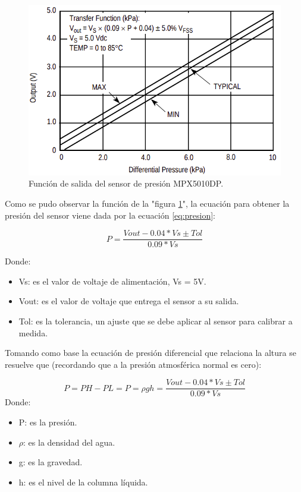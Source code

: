 \begin{figure}[h]
\centering
\includegraphics[scale=.55]{./Figures/SalidaMPX5010DP.png}
\caption{Función de salida del sensor de presión MPX5010DP.}
\label{fig:función de salida del sensor}
\end{figure}
Como se pudo observar la función de la "figura \ref{fig:función de salida del sensor}", la ecuación para obtener la presión del sensor viene dada por la ecuación \ref{eq:presion}:

\begin{equation}
 \label{eq:presion}
 P = \frac{Vout- 0.04*Vs \pm Tol}{0.09*Vs}
\end{equation}

Donde:\\
\begin{itemize}
\item Vs: es el valor de voltaje de alimentación, Vs = 5V.\\
\item Vout: es el valor de voltaje que entrega el sensor  a su salida.\\
\item Tol: es la tolerancia, un ajuste que se debe aplicar al sensor para  calibrar a medida.
\end{itemize}

Tomando como base la ecuación de presión diferencial que relaciona la altura se resuelve que (recordando que a la presión atmosférica normal es cero):  

\begin{equation}
 \label{eq:presión}
	 P =PH -PL= P = \rho gh =\frac{Vout- 0.04*Vs \pm Tol}{0.09*Vs}	
\end{equation}
 Donde:
 \begin{itemize}
 \item P: es la presión.
 \item $\rho$: es la densidad del agua.
 \item g: es la gravedad.
 \item h: es el nivel de la columna líquida.
 \end{itemize}
 
